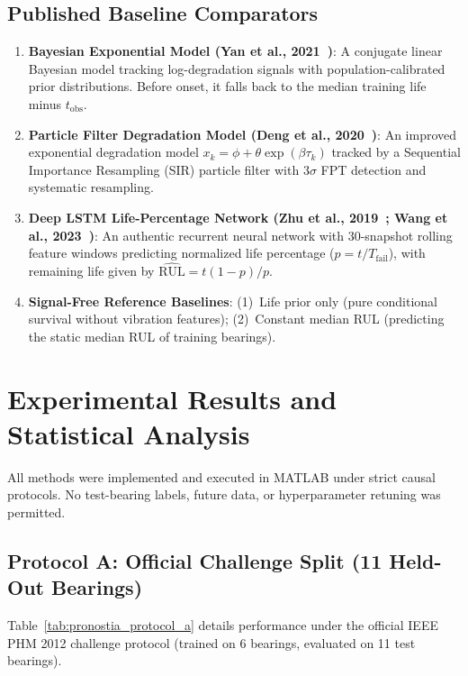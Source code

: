 \documentclass[11pt,a4paper]{article}
\newcommand{\RUL}{\mathrm{RUL}}
\begin{document}
\subsection{Published Baseline Comparators}
\begin{enumerate}[label=(\alph*),leftmargin=2.2em]
    \item \textbf{Bayesian Exponential Model (Yan et al., 2021~\cite{Yan_2021})}: A conjugate linear Bayesian model tracking log-degradation signals with population-calibrated prior distributions. Before onset, it falls back to the median training life minus $t_{\mathrm{obs}}$.
    \item \textbf{Particle Filter Degradation Model (Deng et al., 2020~\cite{Deng_2020})}: An improved exponential degradation model $x_k = \phi + \theta \exp(\beta \tau_k)$ tracked by a Sequential Importance Resampling (SIR) particle filter with $3\sigma$ FPT detection and systematic resampling.
    \item \textbf{Deep LSTM Life-Percentage Network (Zhu et al., 2019~\cite{Zhu_2019}; Wang et al., 2023~\cite{Wang_2022})}: An authentic recurrent neural network with 30-snapshot rolling feature windows predicting normalized life percentage ($p = t / T_{\mathrm{fail}}$), with remaining life given by $\widehat{\RUL} = t(1-p)/p$.
    \item \textbf{Signal-Free Reference Baselines}: (1)~Life prior only (pure conditional survival without vibration features); (2)~Constant median RUL (predicting the static median RUL of training bearings).
\end{enumerate}

\section{Experimental Results and Statistical Analysis}
\label{sec:annex_results}

All methods were implemented and executed in MATLAB under strict causal protocols. No test-bearing labels, future data, or hyperparameter retuning was permitted.

\subsection{Protocol A: Official Challenge Split (11 Held-Out Bearings)}
Table~\ref{tab:pronostia_protocol_a} details performance under the official IEEE PHM 2012 challenge protocol (trained on 6 bearings, evaluated on 11 test bearings).
\end{document}
